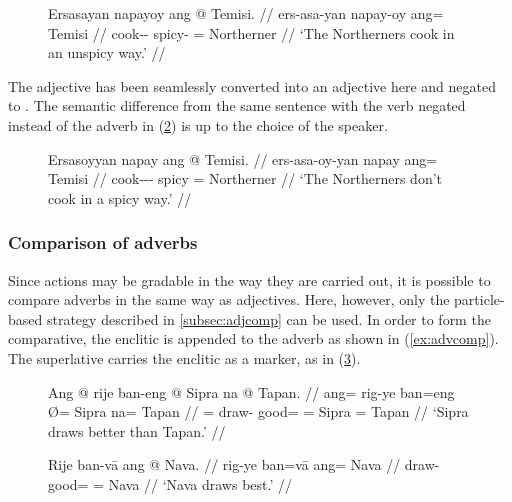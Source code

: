 \begin{figure}[h]
\ex\label{ex:advneg}\begingl
	\gla Ersasayan napayoy ang @ Temisi. //
	\glb ers-asa-yan napay-oy ang= Temisi //
	\glc cook-\Hab{}-\TplM{} spicy-\Neg{} \Aarg{}= Northerner //
	\glft `The Northerners cook in an unspicy way.' //
\endgl\xe
\end{figure}

The adjective  has been seamlessly converted into an
adjective here and negated to . The semantic
difference from the same sentence with the verb negated instead of the adverb
in (\ref{ex:advneg_2}) is up to the choice of the speaker.

\begin{figure}[h]
\ex\label{ex:advneg_2}\begingl
	\gla Ersasoyyan napay ang @ Temisi. //
	\glb ers-asa-oy-yan napay ang= Temisi //
	\glc cook-\Hab{}-\Neg{}-\TplM{} spicy \Aarg{}= Northerner //
	\glft `The Northerners don't cook in a spicy way.' //
\endgl\xe
\end{figure}

\subsubsection{Comparison of adverbs}

Since actions may be gradable in the way they are carried out, it is 
possible to compare adverbs in the same way as adjectives. Here, however, only 
the particle-based strategy described in \autoref{subsec:adjcomp} 
can be used. In order to form the comparative, the enclitic 
 is appended to the adverb as shown in (\ref{ex:advcomp}). The
superlative carries the enclitic  as a marker, as in
(\ref{ex:advsupl}).

\begin{figure}[h]
\pex
\a\label{ex:advcomp}\begingl
	\gla Ang @ rije ban-eng {} @ Sipra na @ Tapan. //
	\glb ang= rig-ye ban=eng Ø= Sipra na= Tapan //
	\glc \AgtT{}= draw-\TsgF{} good=\Comp{} \Top{}= Sipra \Gen{}= Tapan //
	\glft `Sipra draws better than Tapan.' //
\endgl

\a\label{ex:advsupl}\begingl
	\gla Rije ban-vā ang @ Nava. //
	\glb rig-ye ban=vā ang= Nava //
	\glc draw-\TsgF{} good=\Supl{} \Aarg{}= Nava //
	\glft `Nava draws best.' //
\endgl
\xe
\end{figure}

